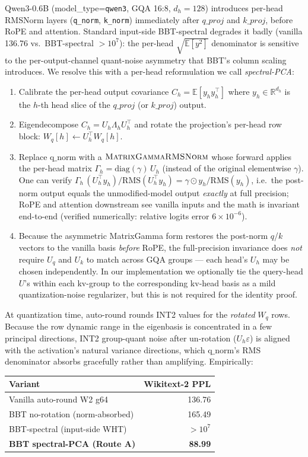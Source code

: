 \documentclass[11pt]{article}
\newcommand{\R}{\mathbb{R}}
\newcommand{\E}{\mathbb{E}}
\begin{document}
Qwen3-0.6B (model\_type=\texttt{qwen3}, GQA 16:8, $d_h=128$) introduces per-head $\mathrm{RMSNorm}$ layers (\texttt{q\_norm}, \texttt{k\_norm}) immediately after $q\_proj$ and $k\_proj$, before RoPE and attention. Standard input-side BBT-spectral degrades it badly (vanilla 136.76 vs.\ BBT-spectral $>10^7$): the per-head $\sqrt{\E[y^2]}$ denominator is sensitive to the per-output-channel quant-noise asymmetry that BBT's column scaling introduces. We resolve this with a per-head reformulation we call \emph{spectral-PCA}:
\begin{enumerate}
    \item Calibrate the per-head output covariance $C_h = \E[y_h y_h^\top]$ where $y_h \in \R^{d_h}$ is the $h$-th head slice of the $q\_proj$ (or $k\_proj$) output.
    \item Eigendecompose $C_h = U_h \Lambda_h U_h^\top$ and rotate the projection's per-head row block: $W_q[h] \leftarrow U_h^\top W_q[h]$.
    \item Replace $\mathrm{q\_norm}$ with a $\textsc{MatrixGammaRMSNorm}$ whose forward applies the per-head matrix $\Gamma_h = \mathrm{diag}(\gamma)\, U_h$ (instead of the original elementwise $\gamma$). One can verify $\Gamma_h\,(U_h^\top y_h)/\mathrm{RMS}(U_h^\top y_h) = \gamma \odot y_h/\mathrm{RMS}(y_h)$, i.e.\ the post-norm output equals the unmodified-model output \emph{exactly} at full precision; RoPE and attention downstream see vanilla inputs and the math is invariant end-to-end (verified numerically: relative logits error $6\times 10^{-6}$).
    \item Because the asymmetric MatrixGamma form restores the post-norm $q$/$k$ vectors to the vanilla basis \emph{before} RoPE, the full-precision invariance does \emph{not} require $U_q$ and $U_k$ to match across GQA groups --- each head's $U_h$ may be chosen independently. In our implementation we optionally tie the query-head $U$'s within each kv-group to the corresponding kv-head basis as a mild quantization-noise regularizer, but this is not required for the identity proof.
\end{enumerate}
At quantization time, auto-round rounds INT2 values for the \emph{rotated} $W_q$ rows. Because the row dynamic range in the eigenbasis is concentrated in a few principal directions, INT2 group-quant noise after un-rotation ($U_h \varepsilon$) is aligned with the activation's natural variance directions, which $\mathrm{q\_norm}$'s RMS denominator absorbs gracefully rather than amplifying. Empirically:
\begin{center}
\begin{tabular}{lr}
\toprule
Variant & Wikitext-2 PPL \\
\midrule
Vanilla auto-round W2 g64 & 136.76 \\
BBT no-rotation (norm-absorbed) & 165.49 \\
BBT-spectral (input-side WHT) & $> 10^7$ \\
\textbf{BBT spectral-PCA (Route A)} & \textbf{88.99} \\
\bottomrule
\end{tabular}
\end{center}
\end{document}
